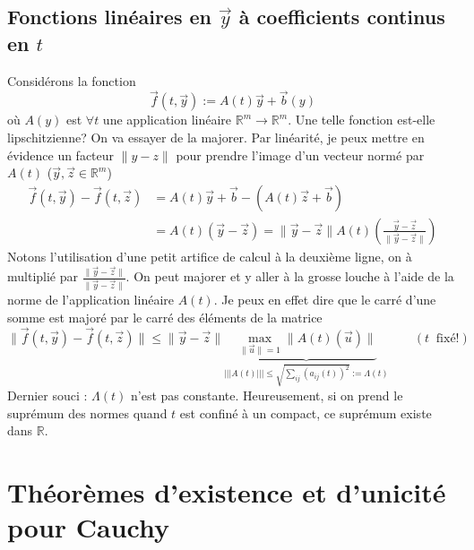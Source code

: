 \subsection{Fonctions linéaires en $\vec{y}$ à coefficients continus en $t$}
Considérons la fonction
\begin{equation}
	\vec{f}(t,\vec{y}) := A(t)\vec{y} + \vec{b}(y)
\end{equation}
où $A(y)$ est $\forall t$ une application linéaire $\mathbb{R}^m\rightarrow
\mathbb{R}^m$. Une telle fonction est-elle lipschitzienne? On va essayer de 
la majorer. Par linéarité, je peux mettre en évidence un facteur $\|y-z\|$ 
pour prendre l'image d'un vecteur normé par $A(t)$ ($\vec{y},\vec{z}\in 
\mathbb{R}^m$)
\begin{equation}
	\begin{array}{ll}
		\vec{f}(t,\vec{y}) - \vec{f}(t,\vec{z}) & = A(t)\vec{y}+\vec{b}-(A(t)\vec{z}+\vec{b})                          \\
		                                        & = A(t)(\vec{y}-\vec z) = \|\vec{y}-\vec{z}\|A(t)\left(\frac{\vec{y}- 
		\vec{z}}{\|\vec{y}-\vec{z}\|}\right)
	\end{array}
\end{equation}
Notons l'utilisation d'une petit artifice de calcul à la deuxième ligne, on à 
multiplié par $\frac{\|\vec y - \vec{z}\|}{\|\vec y - \vec{z}\|}.$
On peut majorer et y aller à la grosse louche à l'aide de la norme de l'application 
linéaire $A(t)$. Je peux en effet dire que le carré d'une somme est majoré par le 
carré des éléments de la matrice
\begin{equation}
	\|\vec{f}(t,\vec{y}) - \vec{f}(t,\vec{z})\| \leq \|\vec{y}-\vec{z}\| \underbrace{
		\max_{\|\vec{u}\| = 1}
		\|A(t)(\vec{u})\|}_{|||A(t)||| \leq \sqrt{\sum_{ij} (a_{ij}(t))^2} := \Lambda(t)}
	\qquad (t\ \text{ fixé!})
\end{equation}
Dernier souci : $\Lambda(t)$ n'est pas constante. Heureusement, si on prend le 
suprémum des normes quand $t$ est confiné à un compact, ce suprémum existe dans 
$\mathbb{R}$.
	

\section{Théorèmes d'existence et d'unicité pour Cauchy}
